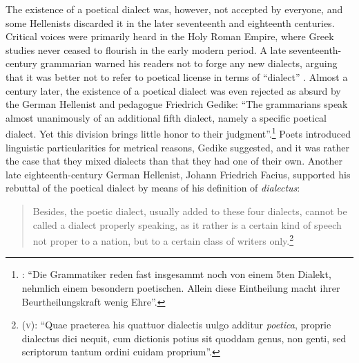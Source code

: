 {The existence of a poetical dialect was, however, not accepted by everyone, and some Hellenists discarded it in the later seventeenth and eighteenth centuries. Critical voices were primarily heard in the Holy Roman Empire, where Greek studies never ceased to flourish in the early modern period. A late seven\-teenth-century grammarian warned his readers not to forge any new dialects, arguing that it was better not to refer to poetical license in terms of “dialect” \citep[512]{Ursin1691}. Almost a century later, the existence of a poetical dialect was even rejected as absurd by the German Hellenist and pedagogue Friedrich Gedike: “The grammarians speak almost unanimously of an additional fifth dialect, namely a specific poetical dialect. Yet this division brings little honor to their judgment”.\footnote{\citet[21]{Gedike1782}: “Die Grammatiker reden fast insgesammt noch von einem 5ten Dialekt, nehmlich einem besondern poetischen. Allein diese Eintheilung macht ihrer Beurtheilungskraft wenig Ehre”.} Poets introduced linguistic particularities for metrical reasons, Gedike suggested, and it was rather the case that they mixed dialects than that they had one of their own. Another late eighteenth-century German Hellenist, Johann Friedrich Facius, supported his rebuttal of the poetical dialect by means of his definition of \textit{dialectus}:

\begin{quote}
Besides, the poetic dialect, usually added to these four dialects, cannot be called a dialect properly speaking, as it rather is a certain kind of speech not proper to a nation, but to a certain class of writers only.\footnote{\citet[]{Facius1782} (\textsc{v}): “Quae praeterea his quattuor dialectis uulgo additur \textit{poetica}, proprie dialectus dici nequit, cum dictionis potius sit quoddam genus, non genti, sed scriptorum tantum ordini cuidam proprium”.}
\end{quote}

}
